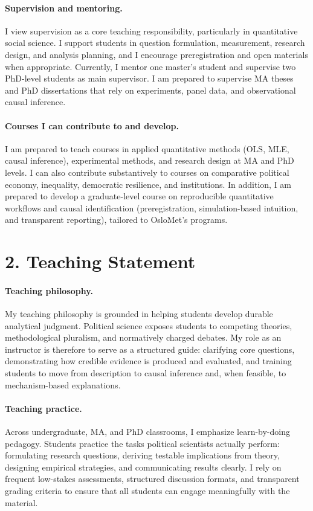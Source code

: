 \documentclass[letterpaper,11pt]{article}
\begin{document}
\paragraph{Supervision and mentoring.}
I view supervision as a core teaching responsibility, particularly in quantitative social science. I support students in question formulation, measurement, research design, and analysis planning, and I encourage preregistration and open materials when appropriate. Currently, I mentor one master's student and supervise two PhD-level students as main supervisor. I am prepared to supervise MA theses and PhD dissertations that rely on experiments, panel data, and observational causal inference.

\paragraph{Courses I can contribute to and develop.}
I am prepared to teach courses in applied quantitative methods (OLS, MLE, causal inference), experimental methods, and research design at MA and PhD levels. I can also contribute substantively to courses on comparative political economy, inequality, democratic resilience, and institutions. In addition, I am prepared to develop a graduate-level course on reproducible quantitative workflows and causal identification (preregistration, simulation-based intuition, and transparent reporting), tailored to OsloMet's programs.

\section*{2. Teaching Statement}

\paragraph{Teaching philosophy.}
My teaching philosophy is grounded in helping students develop durable analytical judgment. Political science exposes students to competing theories, methodological pluralism, and normatively charged debates. My role as an instructor is therefore to serve as a structured guide: clarifying core questions, demonstrating how credible evidence is produced and evaluated, and training students to move from description to causal inference and, when feasible, to mechanism-based explanations.

\paragraph{Teaching practice.}
Across undergraduate, MA, and PhD classrooms, I emphasize learn-by-doing pedagogy. Students practice the tasks political scientists actually perform: formulating research questions, deriving testable implications from theory, designing empirical strategies, and communicating results clearly. I rely on frequent low-stakes assessments, structured discussion formats, and transparent grading criteria to ensure that all students can engage meaningfully with the material.
\end{document}
